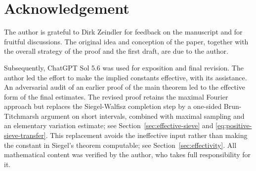 \documentclass[11pt]{amsart}
\numberwithin{equation}{section}
\numberwithin{figure}{section}
\theoremstyle{definition}
\begin{document}
\section*{Acknowledgement}
The author is grateful to Dirk Zeindler for feedback on the manuscript
and for fruitful discussions. The original idea and conception of the
paper, together with the overall strategy of the proof and the first
draft, are due to the author.

Subsequently, ChatGPT Sol 5.6 was used for exposition and final revision. The author led the effort to make the implied constants effective, with its assistance. An adversarial audit of an earlier proof of the main theorem led to the effective form of the final estimates. The revised proof retains the maximal Fourier approach but replaces the Siegel-Walfisz completion step by a one-sided Brun-Titchmarsh argument on short intervals, combined with maximal sampling and an elementary variation estimate; see Section~\ref{sec:effective-sieve} and \eqref{eq:positive-sieve-transfer}. This replacement avoids the ineffective input rather than making the constant in Siegel's theorem computable; see Section~\ref{sec:effectivity}. All mathematical content was verified by the author, who takes full responsibility for it.
\end{document}

